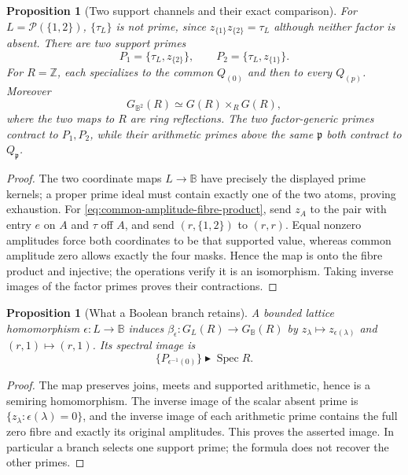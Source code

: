 \documentclass[11pt,a4paper]{article}
\newtheorem{proposition}[theorem]{Proposition}
\theoremstyle{definition}\newtheorem{definition}[theorem]{Definition}
\newcommand{\Z}{\mathbb Z}\newcommand{\Q}{\mathbb Q}
\newcommand{\B}{\mathbb B}\newcommand{\N}{\mathbb N}
\newcommand{\Spec}{\operatorname{Spec}}\newcommand{\SpecMon}{\operatorname{Spec}_{\mathrm{mon}}}
\begin{document}
\begin{proposition}[Two support channels and their exact comparison]\label{prop:two-support-branches}
For $L=\mathcal P(\{1,2\})$, $\{\tau_L\}$ is not prime, since $z_{\{1\}}z_{\{2\}}=\tau_L$ although neither factor is absent. There are two support primes
\[
 P_1=\{\tau_L,z_{\{2\}}\},\qquad P_2=\{\tau_L,z_{\{1\}}\}.
\]
For $R=\Z$, each specializes to the common $Q_{(0)}$ and then to every $Q_{(p)}$. Moreover
\begin{equation}\label{eq:common-amplitude-fibre-product}
 G_{\B^2}(R)\simeq G(R)\mathbin{\times_R}G(R),
\end{equation}
where the two maps to $R$ are ring reflections. The two factor-generic primes contract to $P_1,P_2$, while their arithmetic primes above the same $\mathfrak p$ both contract to $Q_{\mathfrak p}$.
\end{proposition}
\begin{proof}
The two coordinate maps $L\to\B$ have precisely the displayed prime kernels; a proper prime ideal must contain exactly one of the two atoms, proving exhaustion. For \eqref{eq:common-amplitude-fibre-product}, send $z_A$ to the pair with entry $e$ on $A$ and $\tau$ off $A$, and send $(r,\{1,2\})$ to $(r,r)$. Equal nonzero amplitudes force both coordinates to be that supported value, whereas common amplitude zero allows exactly the four masks. Hence the map is onto the fibre product and injective; the operations verify it is an isomorphism. Taking inverse images of the factor primes proves their contractions.
\end{proof}

\begin{proposition}[What a Boolean branch retains]\label{prop:branch-contraction}
A bounded lattice homomorphism $\epsilon:L\to\B$ induces $\beta_\epsilon:G_L(R)\to G_\B(R)$ by $z_\lambda\mapsto z_{\epsilon(\lambda)}$ and $(r,1)\mapsto(r,1)$. Its spectral image is
\[
 \{P_{\epsilon^{-1}(0)}\}\blacktriangleright\Spec R.
\]
\end{proposition}
\begin{proof}
The map preserves joins, meets and supported arithmetic, hence is a semiring homomorphism. The inverse image of the scalar absent prime is $\{z_\lambda:\epsilon(\lambda)=0\}$, and the inverse image of each arithmetic prime contains the full zero fibre and exactly its original amplitudes. This proves the asserted image. In particular a branch selects one support prime; the formula does not recover the other primes.
\end{proof}
\end{document}
